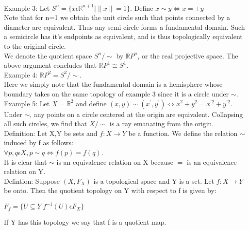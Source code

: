 \documentclass{article}
\begin{document}
\\
Example 3: Let $S^{n} = \{x \epsilon \mathbb{R}^{n+1}| \|x\| = 1\}.$ Define $x \sim y \Leftrightarrow x =  \pm y$
\\Note that for n=1 we obtain the unit circle such that points connected by a diameter are equivalent.  Thus any semi-circle forms a fundamental domain.  Such a semicircle has it's endpoints as equivalent, and is thus topologically equivalent to the original circle.
\\We denote the quotient space $S^{n}/\sim$ by $\mathbb{R}P^{n}$, or the real projective space.  The above argument concludes that $\mathbb{R}P^{1} \cong S^{1}$.
\vspace{40 mm}
\\Example 4: $\mathbb{R}P^{2} = S^{2}/\sim$.
\\Here we simply note that the fundamental domain is a hemisphere whose boundary takes on the same topology of example 3 since it is a circle under $\sim$.
\newpage
Example 5: Let $X=\mathbb{R}^{2}$ and define $(x,y)\sim(x^{'},y^{'}) \Leftrightarrow x^{2}+y^{2}=x^{'2}+y^{'2}$.
\\Under $\sim$, any points on a circle centered at the origin are equivalent.  Collapsing all such circles, we find that $X/\sim$ is a ray emanating from the origin.
\vspace{40 mm}
\\Definition: Let X,Y be sets and $f: X \rightarrow Y$ be a function. We define the relation $\sim$ induced by f as follows:
\\ $\forall p,q \epsilon X, p \sim q \Leftrightarrow f(p)=f(q)$.
\\ It is clear that $\sim$ is an equivalence relation on X because $=$ is an equivalence relation on Y.
\vspace{10 mm}
\\Defintion: Suppose $(X,F_{X})$ is a topological space and Y is a set. Let $f: X \rightarrow Y$ be onto.  Then the quotient topology on Y with respect to f is given by:
\begin{center}
$F_{f}=\{U \subseteq Y | f^{-1}(U) \epsilon F_{X}\}$
\end{center}
If Y has this topology we say that f is a quotient map.
\end{document}
